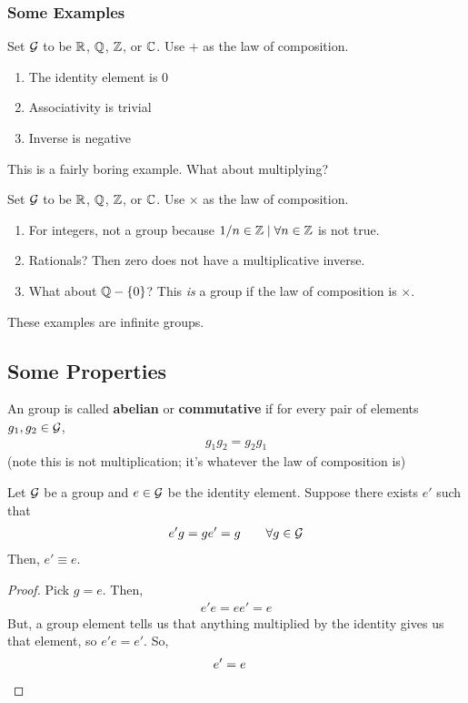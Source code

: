 \subsubsection{Some Examples}
\begin{example}
    Set $\mathcal{G}$ to be $\mathbb{R}$, $\mathbb{Q}$, $\mathbb{Z}$, or $\mathbb{C}$. Use $+$ as the law of composition.
    \begin{enumerate}
        \item The identity element is $0$
        \item Associativity is trivial
        \item Inverse is negative
    \end{enumerate}
\end{example}
This is a fairly boring example. What about multiplying?
\begin{example}
    Set $\mathcal{G}$ to be $\mathbb{R}$, $\mathbb{Q}$, $\mathbb{Z}$, or $\mathbb{C}$. Use $\times$ as the law of composition.
    \begin{enumerate}
        \item For integers, not a group because $1/n \in \mathbb{Z} \mid \forall n \in \mathbb{Z}$ is not true.
        \item Rationals? Then zero does not have a multiplicative inverse.
        \item What about $\mathbb{Q} - \{ 0 \}$? This \textit{is} a group if the law of composition is $\times$.
    \end{enumerate}
\end{example}
These examples are infinite groups.

\subsection{Some Properties}
\begin{definition}
    An group is called \textbf{abelian} or \textbf{commutative} if for every pair of elements $g_1, g_2 \in \mathcal{G}$,
    \begin{align}
        g_1g_2 = g_2g_1
    \end{align}
    (note this is not multiplication; it's whatever the law of composition is)
\end{definition}
\begin{proposition}
    Let $\mathcal{G}$ be a group and $e \in \mathcal{G}$ be the identity element. Suppose there exists $e'$ such that
    \begin{align}
        e'g = ge' = g \qsp \forall g \in \genericgroup
    \end{align}
    Then, $e' \equiv e$.
\end{proposition}
\begin{proof}
    Pick $g = e$. Then,
    \begin{align}
        e'e = ee' = e
    \end{align}
    But, a group element tells us that anything multiplied by the identity gives us that element, so $e'e = e'$. So,
    \begin{align}
        e' = e & \qedhere
    \end{align}
\end{proof}

